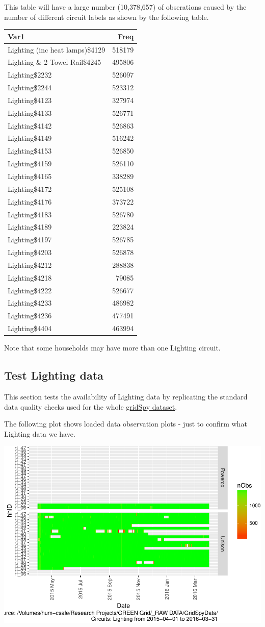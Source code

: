 \documentclass[]{article}
\begin{document}
This table will have a large number (10,378,657) of obserations caused
by the number of different circuit labels as shown by the following
table.

\begin{longtable}[]{@{}lr@{}}
\toprule
Var1 & Freq\tabularnewline
\midrule
\endhead
Lighting (inc heat lamps)\$4129 & 518179\tabularnewline
Lighting \& 2 Towel Rail\$4245 & 495806\tabularnewline
Lighting\$2232 & 526097\tabularnewline
Lighting\$2244 & 523312\tabularnewline
Lighting\$4123 & 327974\tabularnewline
Lighting\$4133 & 526771\tabularnewline
Lighting\$4142 & 526863\tabularnewline
Lighting\$4149 & 516242\tabularnewline
Lighting\$4153 & 526850\tabularnewline
Lighting\$4159 & 526110\tabularnewline
Lighting\$4165 & 338289\tabularnewline
Lighting\$4172 & 525108\tabularnewline
Lighting\$4176 & 373722\tabularnewline
Lighting\$4183 & 526780\tabularnewline
Lighting\$4189 & 223824\tabularnewline
Lighting\$4197 & 526785\tabularnewline
Lighting\$4203 & 526878\tabularnewline
Lighting\$4212 & 288838\tabularnewline
Lighting\$4218 & 79085\tabularnewline
Lighting\$4222 & 526677\tabularnewline
Lighting\$4233 & 486982\tabularnewline
Lighting\$4236 & 477491\tabularnewline
Lighting\$4404 & 463994\tabularnewline
\bottomrule
\end{longtable}

Note that some households may have more than one Lighting circuit.

\subsection{Test Lighting data}\label{test-lighting-data}

This section tests the availability of Lighting data by replicating the
standard data quality checks used for the whole
\href{https://git.soton.ac.uk/ba1e12/nzGREENGrid/tree/master/dataProcessing/gridSpy}{gridSpy
dataset}.

The following plot shows loaded data observation plots - just to confirm
what Lighting data we have.

\includegraphics{nzGGHouseholdPowerDemandProfile_Lighting_2015-04-01_2016-03-31_files/figure-latex/loadedFilesObs Tile Plot-1.pdf}
\end{document}

